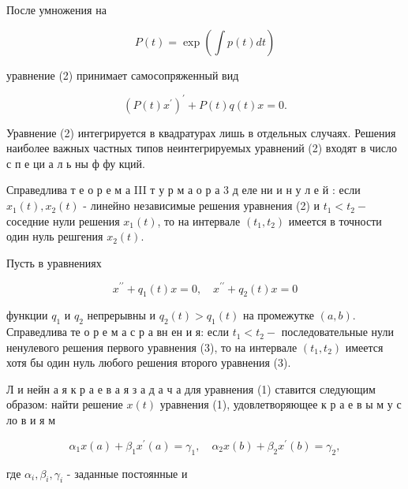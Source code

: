 \documentclass[10pt]{article}
\begin{document}
После умножения на



\[

P(t)=\exp \left(\int p(t) d t\right)

\]



уравнение (2) принимает самосопряженный вид



\[

\left(P(t) x^{\prime}\right)^{\prime}+P(t) q(t) x=0 .

\]



Уравнение (2) интегрируется в квадратурах лишь в отдельных случаях. Решения наиболее важных частных типов неинтегрируемых уравнений (2) входят в число с п е ци а л ь ны $\mathbf{ф}$ фу кций.



Справедлива т е о р е м а III т у р м а о р а 3 д еле ни и н у л е й : если $x_{1}(t), x_{2}(t)$ - линейно независимые решения уравнения (2) и $t_{1}<t_{2}-$ соседние нули решения $x_{1}(t)$, то на интервале $\left(t_{1}, t_{2}\right)$ имеется в точности один нуль решгения $x_{2}(t)$.



Пусть в уравнениях



\[

x^{\prime \prime}+q_{1}(t) x=0, \quad x^{\prime \prime}+q_{2}(t) x=0

\]



функции $q_{1}$ и $q_{2}$ непрерывны и $q_{2}(t)>q_{1}(t)$ на промежутке $(a, b)$. Справедлива те о р е м а с р а вн ен и я: если $t_{1}<t_{2}-$ последовательные нули ненулевого решения первого уравнения (3), то на интервале $\left(t_{1}, t_{2}\right)$ имеется хотя бы один нуль любого решения второго уравнения (3).



Л и нейн а я к р а е в а я з а д а ч а для уравнения (1) ставится следующим образом: найти решение $x(t)$ уравнения (1), удовлетворяющее к р а е в ы м у с ло в и я м



\[

\alpha_{1} x(a)+\beta_{1} x^{\prime}(a)=\gamma_{1}, \quad \alpha_{2} x(b)+\beta_{2} x^{\prime}(b)=\gamma_{2},

\]



где $\alpha_{i}, \beta_{i}, \gamma_{i}$ - заданные постоянные и
\end{document}
